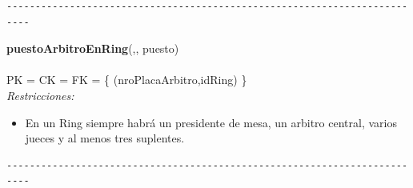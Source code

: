 \begin{verbatim}
--------------------------------------------------------------------------
\end{verbatim}

\noindent\textbf{puestoArbitroEnRing}(,, puesto)
\\
\\
PK = CK = FK = \{ (nroPlacaArbitro,idRing) \} \\

\textit{Restricciones:}
\begin{itemize}
	\item En un Ring siempre habrá un presidente de mesa, un arbitro central, varios jueces y al menos tres suplentes.
\end{itemize}

\begin{verbatim}
--------------------------------------------------------------------------
\end{verbatim}